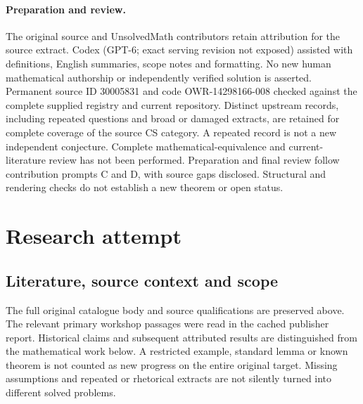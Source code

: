 \documentclass[11pt]{article}
\begin{document}
\paragraph{Preparation and review.}
The original source and UnsolvedMath contributors retain attribution for the source extract. Codex (GPT-6; exact serving revision not exposed) assisted with definitions, English summaries, scope notes and formatting. No new human mathematical authorship or independently verified solution is asserted. Permanent source ID 30005831 and code OWR-14298166-008 checked against the complete supplied registry and current repository. Distinct upstream records, including repeated questions and broad or damaged extracts, are retained for complete coverage of the source CS category. A repeated record is not a new independent conjecture. Complete mathematical-equivalence and current-literature review has not been performed. Preparation and final review follow contribution prompts C and D, with source gaps disclosed. Structural and rendering checks do not establish a new theorem or open status.
\label{end:30005831}

\section{Research attempt}
\subsection{Literature, source context and scope}
The full original catalogue body and source qualifications are preserved above. The relevant primary workshop passages were read in the cached publisher report. Historical claims and subsequent attributed results are distinguished from the mathematical work below. A restricted example, standard lemma or known theorem is not counted as new progress on the entire original target. Missing assumptions and repeated or rhetorical extracts are not silently turned into different solved problems.
\end{document}
